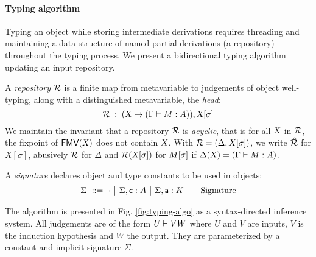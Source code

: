 \documentclass[9pt]{sigplanconf}
\begin{document}

\paragraph{Typing algorithm}

Typing an object while storing intermediate derivations requires
threading and maintaining a data structure of named partial
derivations (a repository) throughout the typing process. We present a
bidirectional typing algorithm updating an input repository.

A \emph{repository} $\mathcal{R}$ is a finite map from metavariable to
judgements of object well-typing, along with a distinguished
metavariable, the \emph{head}:
$$ \mathcal{R}\;:\;(\text{\textsl{X}} \mapsto (\Gamma\vdash{M}:{A})), {\text{\textsl{X}}}[{\sigma}] $$
We maintain the invariant that a repository $\mathcal{R}$ is
\emph{acyclic}, that is for all $\text{\textsl{X}}$ in $\mathcal{R}$, the fixpoint
of ${\text{\textsf{FMV}}}({\text{\textsl{X}}})$ does not contain $\text{\textsl{X}}$. With $\mathcal{R} =
(\Delta, X[\sigma])$, we write $\hat {\mathcal{R}}$ for $X[\sigma]$,
abusively $\mathcal{R}$ for $\Delta$ and $\mathcal{R} ({\text{\textsl{X}}}[{\sigma}])$ for
${M}[{\sigma}]$ if $\Delta(\text{\textsl{X}}) = (\Gamma\vdash M : A)$.

A \emph{signature} declares object and type constants to be used in
objects:
$$
\Sigma \ ::=\ 
\cdot \ {\big|}\ 
{\Sigma},{\text{\textsf{c}} : A} \ {\big|}\ 
{\Sigma},{\text{\textsf{a}} : K} \qquad
\text{Signature}
$$

The algorithm is presented in Fig. \ref{fig:typing-algo} as a
syntax-directed inference system. All judgements are of the form ${U}\vdash{V} W$ where $U$ and $V$ are inputs, $V$ is the induction hypothesis
and $W$ the output. They are parameterized by a constant and implicit
signature $\Sigma$.
\end{document}
